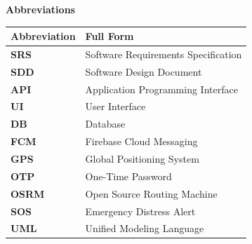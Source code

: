 
\newpage
\thispagestyle{plain}

\begin{center}
\textbf{\LARGE Abbreviations}
\end{center}

\vspace{1cm}

\begin{table}[h]
\centering
\renewcommand{\arraystretch}{1.4}
\begin{tabularx}{\textwidth}{|p{3cm}|X|}
\hline
\textbf{Abbreviation} & \textbf{Full Form} \\
\hline
\textbf{SRS} & Software Requirements Specification \\ \hline
\textbf{SDD} & Software Design Document \\ \hline
\textbf{API} & Application Programming Interface \\ \hline
\textbf{UI} & User Interface \\ \hline
\textbf{DB} & Database \\ \hline
\textbf{FCM} & Firebase Cloud Messaging \\ \hline
\textbf{GPS} & Global Positioning System \\ \hline
\textbf{OTP} & One-Time Password \\ \hline
\textbf{OSRM} & Open Source Routing Machine \\ \hline
\textbf{SOS} & Emergency Distress Alert \\ \hline
\textbf{UML} & Unified Modeling Language \\ \hline
\end{tabularx}
\end{table}

\newpage
